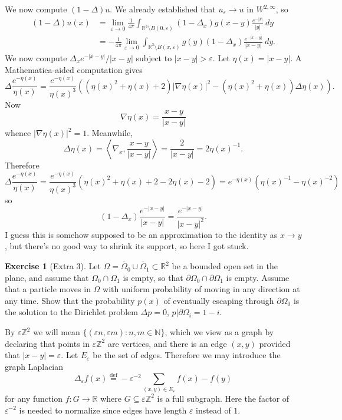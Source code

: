 \documentclass[10pt]{article}
\newcommand{\NN}{\mathbb{N}}
\newcommand{\ZZ}{\mathbb{Z}}
\newcommand{\RR}{\mathbb{R}}
\def\defeq{\overset{\mathrm{def}}{=}}
\theoremstyle{definition}
\newtheorem{exer}{Exercise}
\begin{document}
We now compute $(1 - \Delta)u$. We already established that $u_\varepsilon \to u$ in $W^{2,\infty}$, so
\begin{align*}
(1 - \Delta)u(x) &= \lim_{\varepsilon \to 0} \frac{1}{4\pi} \int_{\RR^3 \setminus B(0, \varepsilon)} (1 - \Delta_x) g(x - y) \frac{e^{-|y|}}{|y|}~dy\\
&= -\frac{1}{4\pi} \lim_{\varepsilon \to 0} \int_{\RR^3 \setminus B(x, \varepsilon)} g(y) (1 - \Delta_x) \frac{e^{-|x-y|}}{|x-y|}~dy.
\end{align*}
We now compute $\Delta_x e^{-|x-y|}/|x-y|$ subject to $|x - y| > \varepsilon$.
Let $\eta(x) = |x-y|$. A Mathematica-aided computation gives
$$\Delta \frac{e^{-\eta(x)}}{\eta(x)} = \frac{e^{-\eta(x)}}{\eta(x)^3} \left((\eta(x)^2 + \eta(x) + 2)|\nabla \eta(x)|^2 - (\eta(x)^2 + \eta(x))\Delta \eta(x) \right).$$
Now
$$\nabla \eta(x) = \frac{x-y}{|x-y|}$$
whence $|\nabla \eta(x)|^2 = 1$. Meanwhile,
$$\Delta \eta(x) =\left \langle \nabla_x, \frac{x-y}{|x-y|} \right\rangle = \frac{2}{|x - y|} = 2\eta(x)^{-1}.$$
Therefore
$$\Delta\frac{e^{-\eta(x)}}{\eta(x)} = \frac{e^{-\eta(x)}}{\eta(x)^3}(\eta(x)^2 + \eta(x) + 2 - 2\eta(x) - 2) = e^{-\eta(x)}(\eta(x)^{-1} - \eta(x)^{-2})$$
so
$$(1 - \Delta_x) \frac{e^{-|x-y|}}{|x-y|} = \frac{e^{-|x-y|}}{|x-y|^2}.$$
I guess this is somehow supposed to be an approximation to the identity as $x \to y$, but there's no good way to shrink its support, so here I got stuck.

\begin{exer}[Extra 3]
Let $\Omega = \overline \Omega_0 \cup \overline \Omega_1 \subset \RR^2$ be a bounded open set in the plane, and assume that $\Omega_0 \cap \Omega_1$ is empty, so that $\partial \Omega_0 \cap \partial \Omega_1$ is empty.
Assume that a particle moves in $\Omega$ with uniform probability of moving in any direction at any time.
Show that the probability $p(x)$ of eventually escaping through $\partial \Omega_0$ is the solution to the Dirichlet problem $\Delta p = 0$, $p|\partial \Omega_i = 1 - i$.
\end{exer}

By $\varepsilon \ZZ^2$ we will mean $\{(\varepsilon n, \varepsilon m): n,m \in \NN\}$, which we view as a graph by declaring that points in $\varepsilon \ZZ^2$ are vertices, and there is an edge $(x, y)$ provided that $|x - y| = \varepsilon$. Let $E_\varepsilon$ be the set of edges.
Therefore we may introduce the graph Laplacian
$$\Delta_\varepsilon f(x) \defeq -\varepsilon^{-2} \sum_{(x, y) \in E_\varepsilon} f(x) - f(y)$$
for any function $f: G \to \RR$ where $G \subseteq \varepsilon \ZZ^2$ is a full subgraph.
Here the factor of $\varepsilon^{-2}$ is needed to normalize since edges have length $\varepsilon$ instead of $1$.
\end{document}
